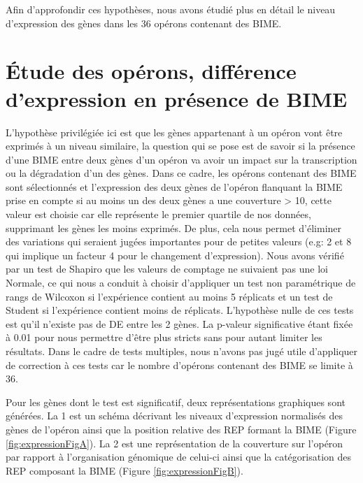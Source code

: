 \documentclass[12pt,a4paper]{report}
\begin{document}
\begin{onehalfspace}
Afin d'approfondir ces hypothèses, nous avons étudié plus en détail le niveau d'expression des gènes dans les 36 opérons contenant des BIME.

\section*{Étude des opérons, différence d'expression en présence de BIME}
\label{expression_operon}
L'hypothèse privilégiée ici est que les gènes appartenant à un opéron vont être exprimés à un niveau similaire, la question qui se pose est de savoir si la présence d'une BIME entre deux gènes d'un opéron va avoir un impact sur la transcription ou la dégradation d'un des gènes. Dans ce cadre, les opérons contenant des BIME sont sélectionnés et l'expression des deux gènes de l'opéron flanquant la BIME prise en compte si au moins un des deux gènes a une couverture > 10, cette valeur est choisie car elle représente le premier quartile de nos données, supprimant les gènes les moins exprimés. De plus, cela nous permet d'éliminer des variations qui seraient jugées importantes pour de petites valeurs (e.g: 2 et 8 qui implique un facteur 4 pour le changement d'expression). Nous avons vérifié par un test de Shapiro que les valeurs de comptage ne suivaient pas une loi Normale, ce qui nous a conduit à choisir d'appliquer un test non paramétrique de rangs de Wilcoxon si l'expérience contient au moins 5 réplicats et un test de Student si l'expérience contient moins de réplicats. L'hypothèse nulle de ces tests est qu'il n'existe pas de DE entre les 2 gènes. La p-valeur significative étant fixée à 0.01 pour nous permettre d'être plus stricts sans pour autant limiter les résultats. Dans le cadre de tests multiples, nous n'avons pas jugé utile d'appliquer de correction à ces tests car le nombre d'opérons contenant des BIME se limite à 36.

Pour les gènes dont le test est significatif, deux représentations graphiques sont générées. La 1 est un schéma décrivant les niveaux d'expression normalisés des gènes de l'opéron ainsi que la position relative des REP formant la BIME (Figure \autoref{fig:expressionFigA}). La 2 est une représentation de la couverture sur l'opéron par rapport à l'organisation génomique de celui-ci ainsi que la catégorisation des REP composant la BIME (Figure \autoref{fig:expressionFigB}).


\end{onehalfspace}
\end{document}
